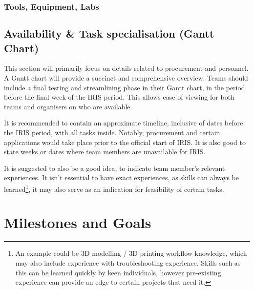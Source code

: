 \documentclass{report}
\begin{document}
        \subsection{Tools, Equipment, Labs}
        \lipsum[11]


	
	\section{Availability \& Task specialisation (Gantt Chart)}
        This section will primarily focus on details related to procurement and personnel. A Gantt chart will provide a succinct and comprehensive overview. Teams should include a final testing and streamlining phase in their Gantt chart, in the period before the final week of the IRIS period. This allows ease of viewing for both teams and organisers on who are available.
        \newline

        \noindent
        It is recommended to contain an approximate timeline, inclusive of dates before the IRIS period, with all tasks inside. Notably, procurement and certain applications would take place prior to the official start of IRIS. It is also good to state weeks or dates where team members are unavailable for IRIS.
        \newline

        \noindent %
        It is suggested to also be a good idea, to indicate team member's relevant experiences. It isn't essential to have exact experiences, as skills can always be learned\footnote{An example could be 3D modelling / 3D printing workflow knowledge, which may also include experience with troubleshooting experience. Skills such as this can be learned quickly by keen individuals, however pre-existing experience can provide an edge to certain projects that need it.}, it may also serve as an indication for feasibility of certain tasks.
	

\chapter{Milestones and Goals}
\end{document}
